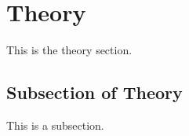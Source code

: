 \section{Theory}
\label{sec:theory}
This is the theory section. \\

\lipsum

\subsection{Subsection of Theory}
This is a subsection. \\

\lipsum
